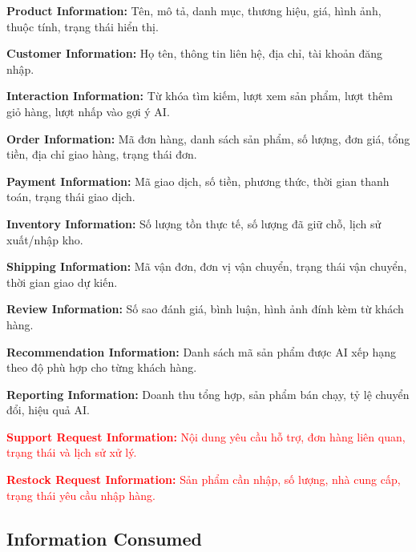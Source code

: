 \documentclass[12pt,a4paper,oneside]{report}
\newif\ifmark \marktrue
\newcommand{\chg}[1]{\ifmark\textcolor{red}{#1}\else #1\fi}
\begin{document}
\begin{itemize}
  \item \textbf{Product Information:} Tên, mô tả, danh mục, thương hiệu, giá, hình ảnh, thuộc tính, trạng thái hiển thị.
  \item \textbf{Customer Information:} Họ tên, thông tin liên hệ, địa chỉ, tài khoản đăng nhập.
  \item \textbf{Interaction Information:} Từ khóa tìm kiếm, lượt xem sản phẩm, lượt thêm giỏ hàng, lượt nhấp vào gợi ý AI.
  \item \textbf{Order Information:} Mã đơn hàng, danh sách sản phẩm, số lượng, đơn giá, tổng tiền, địa chỉ giao hàng, trạng thái đơn.
  \item \textbf{Payment Information:} Mã giao dịch, số tiền, phương thức, thời gian thanh toán, trạng thái giao dịch.
  \item \textbf{Inventory Information:} Số lượng tồn thực tế, số lượng đã giữ chỗ, lịch sử xuất/nhập kho.
  \item \textbf{Shipping Information:} Mã vận đơn, đơn vị vận chuyển, trạng thái vận chuyển, thời gian giao dự kiến.
  \item \textbf{Review Information:} Số sao đánh giá, bình luận, hình ảnh đính kèm từ khách hàng.
  \item \textbf{Recommendation Information:} Danh sách mã sản phẩm được AI xếp hạng theo độ phù hợp cho từng khách hàng.
  \item \textbf{Reporting Information:} Doanh thu tổng hợp, sản phẩm bán chạy, tỷ lệ chuyển đổi, hiệu quả AI.
  \chg{\item \textbf{Support Request Information:} Nội dung yêu cầu hỗ trợ, đơn hàng liên quan, trạng thái và lịch sử xử lý.}
  \chg{\item \textbf{Restock Request Information:} Sản phẩm cần nhập, số lượng, nhà cung cấp, trạng thái yêu cầu nhập hàng.}
\end{itemize}

\subsection{Information Consumed}
\end{document}
